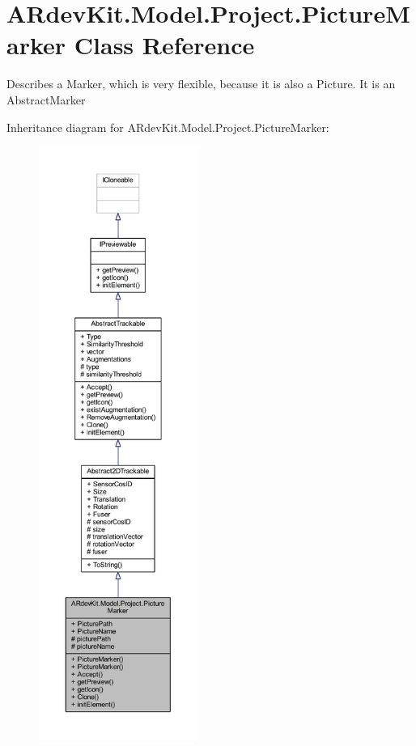 \hypertarget{class_a_rdev_kit_1_1_model_1_1_project_1_1_picture_marker}{\section{A\-Rdev\-Kit.\-Model.\-Project.\-Picture\-Marker Class Reference}
\label{class_a_rdev_kit_1_1_model_1_1_project_1_1_picture_marker}
}


Describes a Marker, which is very flexible, because it is also a Picture. It is an Abstract\-Marker  




Inheritance diagram for A\-Rdev\-Kit.\-Model.\-Project.\-Picture\-Marker\-:
\nopagebreak
\begin{figure}[H]
\begin{center}
\leavevmode
\includegraphics[height=550pt]{class_a_rdev_kit_1_1_model_1_1_project_1_1_picture_marker__inherit__graph}
\end{center}
\end{figure}



